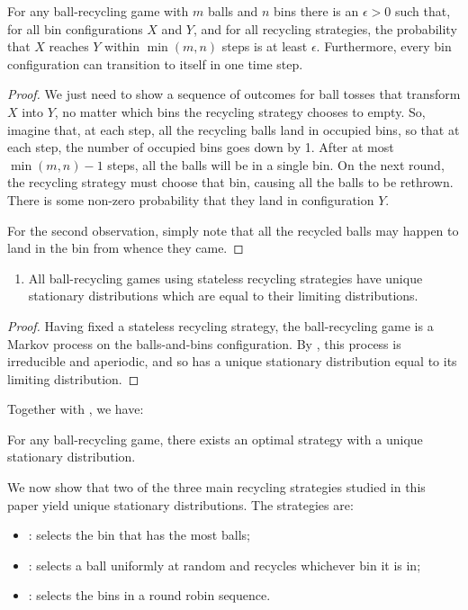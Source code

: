 \begin{lemma}\label{lem:ergodic}
	For any ball-recycling game with $m$ balls and $n$ bins there is an
	$\epsilon>0$ such that, for all bin configurations $X$ and $Y$, and for all
	recycling strategies, the probability that $X$ reaches $Y$ within
	$\min(m,n)$ steps is at least $\epsilon$.  Furthermore, every bin
	configuration can transition to itself in one time step.
\end{lemma}
\begin{proof}
	We just need to show a sequence of outcomes for ball tosses that transform
	$X$ into $Y$, no matter which bins the recycling strategy chooses to empty.
	So, imagine that, at each step, all the recycling balls land in occupied
	bins, so that at each step, the number of occupied bins goes down by 1.
	After at most $\min(m,n)-1$ steps, all the balls will be in a single bin.
	On the next round, the recycling strategy must choose that bin, causing all
	the balls to be rethrown.  There is some non-zero probability that they
	land in configuration $Y$.

	For the second observation, simply note that all the recycled balls may
	happen to land in the bin from whence they came.
\end{proof}

\begin{lemma} \label{lem:stationary}
	\leavevmode
	\begin{enumerate}
	\item All ball-recycling games using stateless recycling strategies have
		unique stationary distributions which are equal to their limiting
		distributions.
  \end{enumerate}
\end{lemma}
\begin{proof}
	Having fixed a stateless recycling strategy, the ball-recycling game is a
	Markov process on the balls-and-bins configuration. By
	, this process is irreducible and aperiodic, and so
	has a unique stationary distribution equal to its limiting distribution.
\end{proof}

Together with , we have:
\begin{corollary} \label{cor:opt-unique}
	For any ball-recycling game, there exists an optimal strategy with a unique
	stationary distribution.
\end{corollary}

We now show that two of the three main recycling strategies studied in this
paper yield unique stationary distributions.  The strategies are:
\begin{itemize}
\item \FB: selects the bin that has the most balls;
\item \RB: selects a ball uniformly at random and recycles whichever bin it is in;
\item \GG: selects the bins in a round robin sequence.
\end{itemize}

